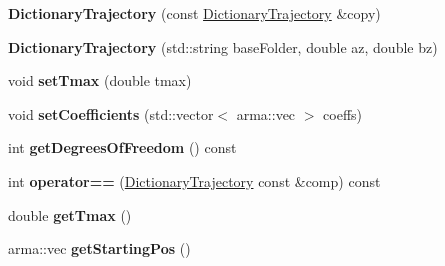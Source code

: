\begin{DoxyCompactItemize}
\item 
{\bfseries Dictionary\+Trajectory} (const \hyperlink{classkukadu_1_1DictionaryTrajectory}{Dictionary\+Trajectory} \&copy)\hypertarget{classkukadu_1_1DictionaryTrajectory_a870747d3c8944989b77d1eef393c95aa}{}\label{classkukadu_1_1DictionaryTrajectory_a870747d3c8944989b77d1eef393c95aa}

\item 
{\bfseries Dictionary\+Trajectory} (std\+::string base\+Folder, double az, double bz)\hypertarget{classkukadu_1_1DictionaryTrajectory_ac86c379b5928d442991b7bf16a9dabc5}{}\label{classkukadu_1_1DictionaryTrajectory_ac86c379b5928d442991b7bf16a9dabc5}

\item 
void {\bfseries set\+Tmax} (double tmax)\hypertarget{classkukadu_1_1DictionaryTrajectory_ad6e50b83eca9a28f4f1f491aca0adced}{}\label{classkukadu_1_1DictionaryTrajectory_ad6e50b83eca9a28f4f1f491aca0adced}

\item 
void {\bfseries set\+Coefficients} (std\+::vector$<$ arma\+::vec $>$ coeffs)\hypertarget{classkukadu_1_1DictionaryTrajectory_a0a8f57d5f4f0928a86e33c72b4b13b72}{}\label{classkukadu_1_1DictionaryTrajectory_a0a8f57d5f4f0928a86e33c72b4b13b72}

\item 
int {\bfseries get\+Degrees\+Of\+Freedom} () const \hypertarget{classkukadu_1_1DictionaryTrajectory_adda7370fe6219f6ebc338dfd069eb82d}{}\label{classkukadu_1_1DictionaryTrajectory_adda7370fe6219f6ebc338dfd069eb82d}

\item 
int {\bfseries operator==} (\hyperlink{classkukadu_1_1DictionaryTrajectory}{Dictionary\+Trajectory} const \&comp) const \hypertarget{classkukadu_1_1DictionaryTrajectory_a7555c07b4021fc812273ccbcfbf687e4}{}\label{classkukadu_1_1DictionaryTrajectory_a7555c07b4021fc812273ccbcfbf687e4}

\item 
double {\bfseries get\+Tmax} ()\hypertarget{classkukadu_1_1DictionaryTrajectory_ac712e5e1bb0ffdeff574b215adbf483c}{}\label{classkukadu_1_1DictionaryTrajectory_ac712e5e1bb0ffdeff574b215adbf483c}

\item 
arma\+::vec {\bfseries get\+Starting\+Pos} ()\hypertarget{classkukadu_1_1DictionaryTrajectory_a271c61b9017bc3bab7c8743197680310}{}\label{classkukadu_1_1DictionaryTrajectory_a271c61b9017bc3bab7c8743197680310}


\end{DoxyCompactItemize}
